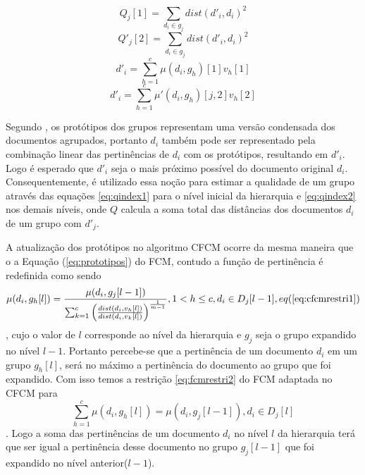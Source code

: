 \begin{equation}
  Q_j[1] = \sum_{d_i \in g_j} dist(d'_i,d_i)^2
  \label{eq:qindex1}
\end{equation}
\begin{equation}
  Q'_j[2] = \sum_{d_i \in g_j} dist(d'_i,d_i)^2
  \label{eq:qindex2}
\end{equation}
\begin{equation}
  d'_i = \sum_{h=1}^c \mu(d_i,g_h)[1]v_h[1] 
  \label{eq:dlinha1}
\end{equation}
\begin{equation}
  d'_i = \sum_{h=1}^c \mu'(d_i,g_h)[j,2]v_h[2] 
  \label{eq:dlinha2}
\end{equation}

Segundo \cite{Nogueira2013},
os protótipos dos grupos representam uma versão condensada dos documentos agrupados, portanto
$d_i$ também pode ser representado pela combinação linear das pertinências de $d_i$ com os
protótipos, resultando em $d'_i$. Logo é esperado que $d'_i$ seja o mais próximo possível do 
documento
original $d_i$. Consequentemente, é utilizado essa noção para estimar a qualidade de um grupo
através das equações \ref{eq:qindex1} para o nível inicial da hierarquia e \ref{eq:qindex2} nos
demais níveis, onde $Q$ calcula a soma total das distâncias dos documentos $d_i$ de um grupo com
$d'_j$.

A atualização dos protótipos no algoritmo CFCM ocorre da mesma maneira que o a Equação
(\ref{eq:prototipos}) do FCM, contudo a função de pertinência é redefinida como sendo
\begin{equation}
  \mu(d_i,g_h[l]) = \frac{\mu(d_i,g_j[l-1])}
  {\sum_{k=1}^c \left(\frac{dist(d_i,v_h[l])}{dist(d_i,v_k[l])}\right)^{\frac{1}{m-1}}}, 
  1 < h \leq c,
  d_i \in D_j[l-1], eq (\ref{eq:cfcmrestri1})
  \label{eq:pertcfcm}
\end{equation}
, cujo o valor de $l$ corresponde ao nível da hierarquia e $g_j$ seja o grupo 
expandido no nível $l-1$.
Portanto percebe-se que a pertinência
de um documento $d_i$ em um grupo $g_h[l]$, será no máximo a pertinência do documento ao grupo que
foi expandido. Com isso temos a restrição \ref{eq:fcmrestri2} do FCM adaptada no CFCM para
\begin{equation}
  \sum_{h=1}^c \mu(d_i,g_h[l]) = \mu(d_i,g_j[l-1]), d_i \in D_j[l]
  \label{eq:cfcmrestri1}
\end{equation}
. Logo a soma das pertinências de um documento $d_i$ no nível $l$ da hierarquia terá que ser igual 
a pertinência desse documento no grupo $g_j[l-1]$ que foi expandido no nível anterior($l-1$).

